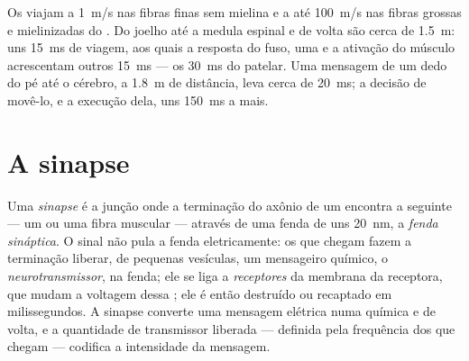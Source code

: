 \begin{example}[A velocidade]\label{ex:g12:stretch-reflex:speed}
Os  viajam a \qty{1}{m/s} nas fibras finas sem
mielina e a até \qty{100}{m/s} nas fibras grossas e mielinizadas do
. Do joelho até a medula espinal e de volta são
cerca de \qty{1.5}{m}: uns \qty{15}{ms} de viagem, aos quais a resposta
do fuso, uma  e a ativação do músculo acrescentam outros
\qty{15}{ms} --- os \qty{30}{ms} do  patelar. Uma mensagem de um
dedo do pé até o cérebro, a \qty{1.8}{m} de distância, leva cerca de
\qty{20}{ms}; a decisão de movê-lo, e a execução dela, uns \qty{150}{ms} a mais.
\end{example}

\section{A sinapse}

\begin{definition}\label{def:g12:stretch-reflex:synapse}
Uma \emph{sinapse} é a junção onde a terminação do
axônio de um  encontra a  seguinte --- um  ou uma
fibra muscular --- através de uma fenda de uns \qty{20}{nm}, a
\emph{fenda sináptica}. O sinal não pula a fenda eletricamente: os
 que chegam fazem a terminação liberar, de pequenas
vesículas, um mensageiro químico, o
\emph{neurotransmissor}, na fenda; ele se liga
a \emph{receptores} da membrana da  receptora, que mudam a
voltagem dessa ; ele é então destruído ou recaptado em
milissegundos. A sinapse converte uma mensagem elétrica numa química e
de volta, e a quantidade de transmissor liberada --- definida pela
frequência dos  que chegam --- codifica a intensidade
da mensagem.
\end{definition}

